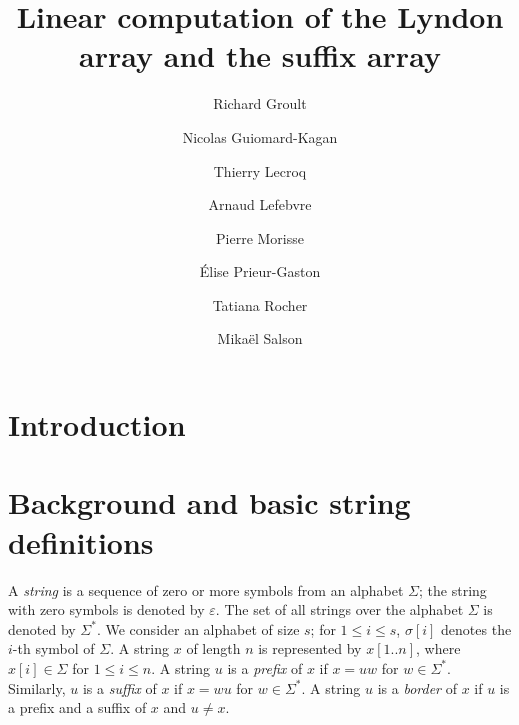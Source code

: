 \documentclass{article}
\begin{document}
\title{Linear computation of the Lyndon array and the suffix array
}

\author{
Richard Groult
\and
Nicolas Guiomard-Kagan
\and
Thierry Lecroq
\and
Arnaud Lefebvre
\and
Pierre Morisse
\and
\'Elise Prieur-Gaston
\and
Tatiana Rocher
\and
Mikaël Salson
}

\date{}

\maketitle

\begin{abstract}
\end{abstract}


\section{Introduction}
\label{sec:intro}

\section{Background and basic string definitions}
\label{sec:background}

A {\em string} is a sequence of zero or more symbols from an
 alphabet $\Sigma$; the string with zero symbols is denoted by
 $\varepsilon$.
The set of all strings over the alphabet $\Sigma$ is
 denoted by $\Sigma^*$.
We consider an alphabet of size $s$;
 for $1 \leq i \leq s$, $\sigma[i]$ denotes the $i$-th symbol of
 $\Sigma$.
A string $x$ of length $n$ is represented
 by $x[1..n]$, where $x[i]\in\Sigma$ for $1\le i\le n$.
A string $u$ is a {\em prefix} of $x$ if $x=uw$ for $w\in\Sigma^*$.
Similarly, $u$ is a {\em suffix} of $x$ if $x=wu$ for
 $w\in\Sigma^*$.
A string $u$ is a {\em border} of $x$ if $u$ is a prefix and a
 suffix of $x$ and $u \neq x$.
\end{document}

